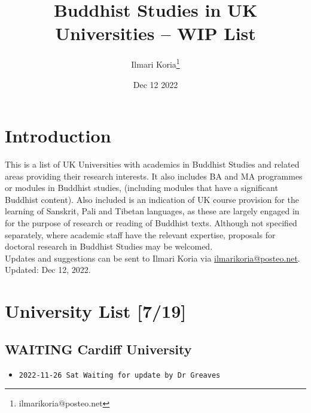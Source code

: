 \documentclass[11pt]{article}
\author{Ilmari Koria\thanks{ilmarikoria@posteo.net}}
\date{Dec 12 2022}
\title{Buddhist Studies in UK Universities -- WIP List}
\begin{document}
\maketitle
\setcounter{tocdepth}{2}
\tableofcontents {} \newpage
\section*{Introduction}
\label{sec:org64e978b}
This is a list of UK Universities with academics in Buddhist Studies and related areas providing their research interests. It also includes BA and MA programmes or modules in Buddhist studies, (including modules that have a significant Buddhist content). Also included is an indication of UK course provision for the learning of Sanskrit, Pali and Tibetan languages, as these are largely engaged in for the purpose of research or reading of Buddhist texts. Although not specified separately, where academic staff have the relevant expertise, proposals for doctoral research in Buddhist Studies may be welcomed.\\

Updates and suggestions can be sent to Ilmari Koria via \href{mailto:ilmarikoria@posteo.net}{ilmarikoria@posteo.net}.\\

Updated: Dec 12, 2022.\\

\section*{University List [7/19]}
\label{sec:org9f51af4}
\subsection*{{\bfseries\sffamily WAITING} Cardiff University}
\label{sec:org2c1b8b3}
\begin{itemize}
\item \texttt{2022-11-26 Sat Waiting for update by Dr Greaves}\\
\end{itemize}
\end{document}
